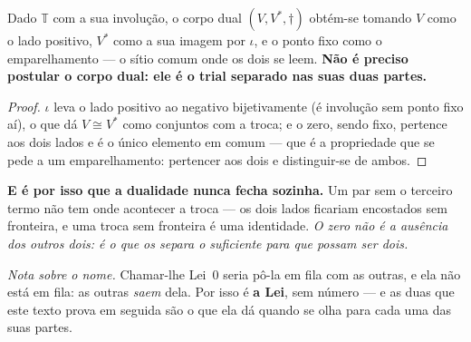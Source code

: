 \documentclass[livro.tex]{subfiles}
\begin{document}
\begin{teorema}\label{thm:dualdotrial}
Dado $\mathbb{T}$ com a sua involução, o corpo dual $(V,V^{*},\dagger)$ obtém-se tomando $V$ como
o lado positivo, $V^{*}$ como a sua imagem por $\iota$, e o ponto fixo como o emparelhamento ---
o sítio comum onde os dois se leem. \textbf{Não é preciso postular o corpo dual: ele é o trial
separado nas suas duas partes.}
\end{teorema}

\begin{proof}
$\iota$ leva o lado positivo ao negativo bijetivamente (é involução sem ponto fixo aí), o que dá
$V\cong V^{*}$ como conjuntos com a troca; e o zero, sendo fixo, pertence aos dois lados e é o
único elemento em comum --- que é a propriedade que se pede a um emparelhamento: pertencer aos dois
e distinguir-se de ambos.
\end{proof}

\noindent \textbf{E é por isso que a dualidade nunca fecha sozinha.} Um par sem o terceiro termo
não tem onde acontecer a troca --- os dois lados ficariam encostados sem fronteira, e uma troca
sem fronteira é uma identidade. \emph{O zero não é a ausência dos outros dois: é o que os separa o
suficiente para que possam ser dois.}

\medskip
\noindent \emph{Nota sobre o nome.} Chamar-lhe Lei~$0$ seria pô-la em fila com as outras, e ela não
está em fila: as outras \emph{saem} dela. Por isso é \textbf{a Lei}, sem número --- e as duas que
este texto prova em seguida são o que ela dá quando se olha para cada uma das suas partes.
\end{document}
